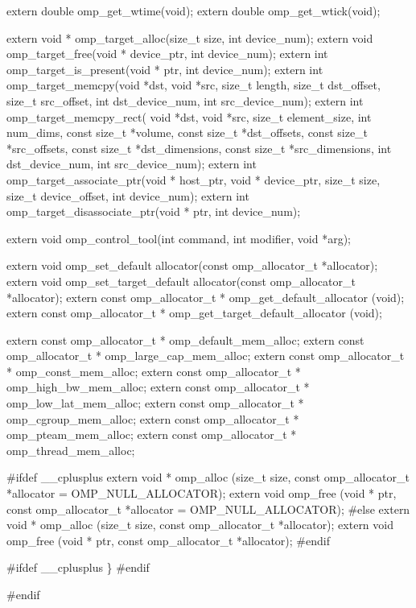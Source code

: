 {\begin{codepar}
extern double omp\_get\_wtime(void);
extern double omp\_get\_wtick(void);

extern void * omp\_target\_alloc(size\_t size, int device\_num);
extern void omp\_target\_free(void * device\_ptr, int device\_num);
extern int omp\_target\_is\_present(void * ptr, int device\_num);
extern int omp\_target\_memcpy(void *dst, void *src, size\_t length,
                              size\_t dst\_offset, size\_t src\_offset,
                              int dst\_device\_num, int src\_device\_num);
extern int omp\_target\_memcpy\_rect(
    void *dst, void *src,
    size\_t element\_size,
    int num\_dims,
    const size\_t *volume,
    const size\_t *dst\_offsets,
    const size\_t *src\_offsets,
    const size\_t *dst\_dimensions,
    const size\_t *src\_dimensions,
    int dst\_device\_num, int src\_device\_num);
extern int omp\_target\_associate\_ptr(void * host\_ptr,
                                       void * device\_ptr,
                                       size\_t size,
                                       size\_t device\_offset,
                                       int device\_num);
extern int omp\_target\_disassociate\_ptr(void * ptr,
                                          int device\_num);

extern void omp\_control\_tool(int command, int modifier, void *arg);

extern void omp\_set\_default allocator(const omp\_allocator\_t *allocator);
extern void omp\_set\_target\_default allocator(const omp\_allocator\_t *allocator);
extern const omp\_allocator\_t * omp\_get\_default\_allocator (void);
extern const omp\_allocator\_t * omp\_get\_target\_default\_allocator (void);


extern const omp_allocator_t * omp_default_mem_alloc;
extern const omp_allocator_t * omp_large_cap_mem_alloc;
extern const omp_allocator_t * omp_const_mem_alloc;
extern const omp_allocator_t * omp_high_bw_mem_alloc;
extern const omp_allocator_t * omp_low_lat_mem_alloc;
extern const omp_allocator_t * omp_cgroup_mem_alloc;
extern const omp_allocator_t * omp_pteam_mem_alloc;
extern const omp_allocator_t * omp_thread_mem_alloc;


\#ifdef _\_cplusplus
extern void * omp\_alloc (size\_t size, 
                          const omp\_allocator\_t *allocator = OMP\_NULL\_ALLOCATOR);
extern void omp\_free (void * ptr, 
                       const omp\_allocator\_t *allocator = OMP\_NULL\_ALLOCATOR);
\#else
extern void * omp\_alloc (size\_t size, const omp\_allocator\_t *allocator);
extern void omp\_free (void * ptr, const omp\_allocator\_t *allocator);
\#endif


\#ifdef _\_cplusplus
\}
\#endif

\#endif
\end{codepar}} %

